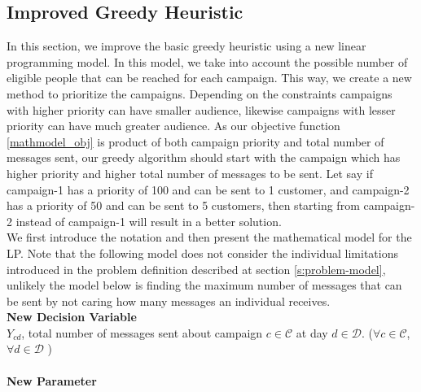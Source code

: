 \documentclass[11pt]{article}
\begin{document}
\subsection{Improved Greedy Heuristic} \label{s:greedy_heuristic_improved}
In this section, we improve the basic greedy heuristic using a new linear programming model. In this model, we take into account the possible number of eligible people that can be reached for each campaign. This way, we create a new method to prioritize the campaigns. 
Depending on the constraints campaigns with higher priority can have smaller audience, likewise campaigns with lesser priority can have much greater audience. As our objective function \eqref{mathmodel_obj} is product of both campaign priority and total number of messages sent, our greedy algorithm should start with the campaign which has higher priority and higher total number of messages to be sent. Let say if campaign-1 has a priority of 100 and can be sent to 1 customer, and campaign-2 has a priority of 50 and can be sent to 5 customers, then starting from campaign-2 instead of campaign-1 will result in a better solution.
\\
We first introduce the notation and then present the mathematical model for the LP. Note that the following model does not consider the individual limitations introduced in the problem definition described at section \s\ref{s:problem-model}, unlikely the model below is finding the maximum number of messages that can be sent by not caring how many messages an individual receives.\\


\noindent \textbf{New Decision Variable}\\

\noindent $Y_{{c}{d}}$, total number of messages sent about campaign $c \in \mathcal{C}$ at day $d \in \mathcal{D}$.
($\forall c \in \mathcal{C}$, $\forall d \in \mathcal{D}$ )\\
\\

\noindent \textbf{New Parameter}\\
\end{document}
